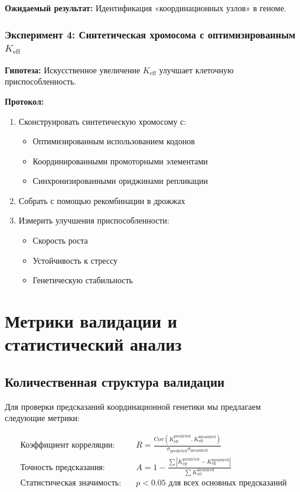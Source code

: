 \documentclass[12pt]{article}
\begin{document}
	\textbf{Ожидаемый результат:} Идентификация «координационных узлов» в геноме.
	
	\subsubsection{Эксперимент 4: Синтетическая хромосома с оптимизированным $K_{\text{eff}}$}
	\textbf{Гипотеза:} Искусственное увеличение $K_{\text{eff}}$ улучшает клеточную приспособленность.
	
	\textbf{Протокол:}
	\begin{enumerate}
		\item Сконструировать синтетическую хромосому с:
		\begin{itemize}
			\item Оптимизированным использованием кодонов
			\item Координированными промоторными элементами
			\item Синхронизированными ориджинами репликации
		\end{itemize}
		\item Собрать с помощью рекомбинации в дрожжах
		\item Измерить улучшения приспособленности:
		\begin{itemize}
			\item Скорость роста
			\item Устойчивость к стрессу
			\item Генетическую стабильность
		\end{itemize}
	\end{enumerate}
	
	\section{Метрики валидации и статистический анализ}
	
	\subsection{Количественная структура валидации}
	
	Для проверки предсказаний координационной генетики мы предлагаем следующие метрики:
	
	\begin{align*}
		\text{Коэффициент корреляции:} & \quad R = \frac{\text{Cov}(K_{\text{eff}}^{\text{predicted}}, K_{\text{eff}}^{\text{measured}})}{\sigma_{\text{predicted}} \sigma_{\text{measured}}} \\
		\text{Точность предсказания:} & \quad A = 1 - \frac{\sum |K_{\text{eff}}^{\text{predicted}} - K_{\text{eff}}^{\text{measured}}|}{\sum K_{\text{eff}}^{\text{measured}}} \\
		\text{Статистическая значимость:} & \quad p < 0.05 \text{ для всех основных предсказаний}
	\end{align*}
	
\end{document}
